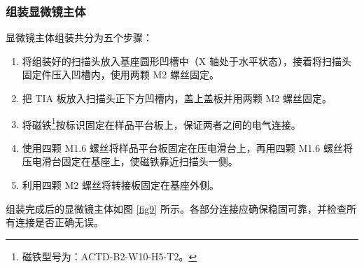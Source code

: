 \documentclass[zihao=-4]{ctexart}
\begin{document}
\begin{spacing}{1.5}
			
			
		
		
		\subsubsection{组装显微镜主体}
			显微镜主体组装共分为五个步骤：
			\begin{enumerate}
				\item 将组装好的扫描头放入基座圆形凹槽中（X 轴处于水平状态），接着将扫描头固定件压入凹槽内，使用两颗 M2 螺丝固定。
				\item 把 TIA 板放入扫描头正下方凹槽内，盖上盖板并用两颗 M2 螺丝固定。
				\item 将磁铁\footnote{磁铁型号为：ACTD-B2-W10-H5-T2。}按标识固定在样品平台板上，保证两者之间的电气连接。
				\item 使用四颗 M1.6 螺丝将样品平台板固定在压电滑台上，再用四颗 M1.6 螺丝将压电滑台固定在基座上，使磁铁靠近扫描头一侧。
				\item 利用四颗 M2 螺丝将转接板固定在基座外侧。
			\end{enumerate}
				组装完成后的显微镜主体如图 \ref{fig9} 所示。各部分连接应确保稳固可靠，并检查所有连接是否正确无误。
			\begin{figure}[htbp]
				\centering
				\hfill
				\begin{subfigure}{0.4\textwidth}
					\centering
\end{subfigure}
\end{figure}
\end{spacing}
\end{document}
